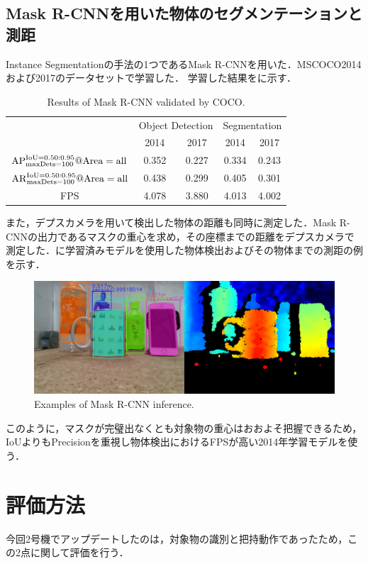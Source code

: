 \subsection{Mask R-CNNを用いた物体のセグメンテーションと測距}
Instance Segmentationの手法の1つであるMask R-CNNを用いた．MSCOCO2014および2017のデータセットで学習した．
学習した結果をに示す．

\begin{table}[H]
    \centering
    \caption{Results of Mask R-CNN validated by COCO.}
    \begin{tabular}{ccccc}\toprule
        & \multicolumn{2}{c}{Object Detection} & \multicolumn{2}{c}{Segmentation} \\ 
         & 2014 & 2017 & 2014 & 2017 \\ \midrule
        $\rm{AP}^{\rm{IoU}=0.50:0.95} _{\rm maxDets=100} @Area=all$ & 0.352 & 0.227 & 0.334 & 0.243 \\ 
        $\rm{AR}^{\rm{IoU}=0.50:0.95} _{\rm maxDets=100} @Area=all$ & 0.438 & 0.299 & 0.405 & 0.301 \\ 
        FPS & 4.078 & 3.880 & 4.013 & 4.002 \\ \bottomrule
    \end{tabular} 
    \label{tab:MSCOCO評価}
\end{table}

また，デプスカメラを用いて検出した物体の距離も同時に測定した．Mask R-CNNの出力であるマスクの重心を求め，その座標までの距離をデプスカメラで測定した．に学習済みモデルを使用した物体検出およびその物体までの測距の例を示す．

\begin{figure}[H]
    \centering
    \includegraphics[width=0.7\linewidth]{figure/chapter4/MaskR-CNN_screenshot}
    \caption{Examples of Mask R-CNN inference.}
    \label{fig:maskrcnn例}
\end{figure}


このように，マスクが完璧出なくとも対象物の重心はおおよそ把握できるため，IoUよりもPrecisionを重視し物体検出におけるFPSが高い2014年学習モデルを使う．


\section{評価方法}
今回2号機でアップデートしたのは，対象物の識別と把持動作であったため，この2点に関して評価を行う．

